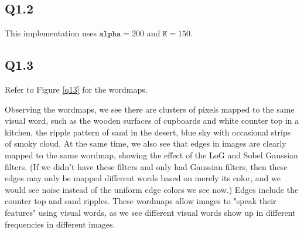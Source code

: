 \documentclass{article} %
\begin{document}
    \subsection*{Q1.2}
    This implementation uses $\texttt{alpha} = 200$ and $\texttt{K} = 150$.

    \subsection*{Q1.3}

    Refer to Figure \ref{q13} for the wordmaps.
    \smallskip

    Observing the wordmaps, we see there are clusters of pixels mapped to the same visual word, such as the wooden surfaces of cupboards and white counter top in a kitchen, the ripple pattern of sand in the desert, blue sky with occasional strips of smoky cloud. At the same time, we also see that edges in images are clearly mapped to the same wordmap, showing the effect of the LoG and Sobel Gaussian filters. (If we didn't have these filters and only had Gaussian filters, then these edges may only be mapped different words based on merely its color, and we would see noise instead of the uniform edge colors we see now.) Edges include the counter top and sand ripples. These wordmaps allow images to "speak their features" using visual words, as we see different visual words show up in different frequencies in different images.
\end{document}
